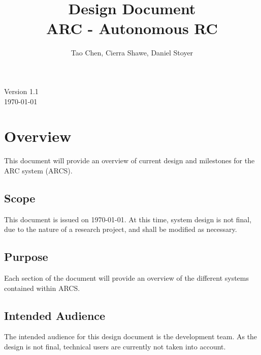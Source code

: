 \documentclass[compsoc,draftclsnofoot,onecolumn,10pt]{IEEEtran}
\date{}
\begin{document}
\begin{titlepage}
	\title{Design Document\\
	ARC - Autonomous RC}
	\author{Tao Chen, Cierra Shawe, Daniel Stoyer}
	\maketitle
	\begin{center}
		Version 1.1\\
		\today
	\end{center}

	\thispagestyle{empty} %
	
\end{titlepage}

\tableofcontents

\newpage

\section{Overview}  
This document will provide an overview of current design and milestones for the ARC system (ARCS). 
\subsection{Scope} 
This document is issued on \today. At this time, system design is not final, due to the nature of a research project, and shall be modified as necessary. 
\subsection{Purpose}
Each section of the document will provide an overview of the different systems contained within ARCS.
\subsection{Intended Audience} 
The intended audience for this design document is the development team. As the design is not final, technical users are currently not taken into account. 
\end{document}
